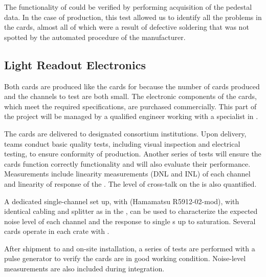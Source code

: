 The functionality of  could be verified by performing acquisition of the pedestal data. In the case of  production, this test allowed us to identify all the problems in the cards, almost all of which%
were a result of defective soldering that was not spotted by the automated  procedure of the manufacturer. 


\subsection{Light Readout Electronics}
\label{ssec:dp-tpcelec-prod-lro}

Both   cards are produced like the cards for  because the number of cards produced and the channels to test are both small. The electronic components of the cards, which meet the required specifications, are purchased commercially. This part of the project will be managed by a qualified engineer working with a specialist in .

The cards are delivered to designated consortium institutions. Upon delivery, teams conduct basic quality tests, including visual inspection and electrical testing, to ensure conformity of production. Another series of tests will ensure the cards function correctly functionality and will also evaluate their performance. Measurements include linearity measurements (DNL and INL) of each  channel and linearity of response of the . The level of cross-talk on the  is also quantified.

A dedicated single-channel set up, with  (Hamamatsu R5912-02-mod), with identical cabling and splitter as in the , can be used to characterize the expected noise level of each channel and the response to single \phel{}s up to saturation. 
Several cards operate in each  crate with .

After shipment to  and on-site installation, a series of tests are performed with a pulse generator to verify the cards are in good working condition. Noise-level measurements are also included during integration.
